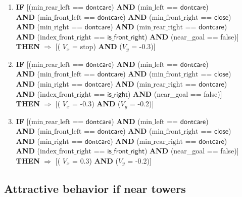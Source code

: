 \begin{enumerate}
	\item \textbf{IF} [($\text{min\_rear\_left}$ == $\textsf{dontcare}$) 
	\textbf{AND} ($\text{min\_left}$ == $\textsf{dontcare}$)\\
	\textbf{AND} ($\text{min\_front\_left}$ == $\textsf{dontcare}$)
	\textbf{AND} ($\text{min\_front\_right}$ == $\textsf{close}$)\\
	\textbf{AND} ($\text{min\_right}$ == $\textsf{dontcare}$) 
	\textbf{AND} ($\text{min\_rear\_right}$ == $\textsf{dontcare}$) \\
	\textbf{AND} ($\text{index\_front\_right}$ == $\textsf{is\_front\_right}$)
	\textbf{AND} (near\_goal == \textsf{false})]\\
	\textbf{THEN} $\Rightarrow$ [( $V_x$ = \textsf{stop}) \textbf{AND} ($V_y$ = \textsf{-0.3})]
	
	\item \textbf{IF} [($\text{min\_rear\_left}$ == $\textsf{dontcare}$) 
	\textbf{AND} ($\text{min\_left}$ == $\textsf{dontcare}$)\\
	\textbf{AND} ($\text{min\_front\_left}$ == $\textsf{dontcare}$)
	\textbf{AND} ($\text{min\_front\_right}$ == $\textsf{close}$)\\
	\textbf{AND} ($\text{min\_right}$ == $\textsf{dontcare}$) 
	\textbf{AND} ($\text{min\_rear\_right}$ == $\textsf{dontcare}$) \\
	\textbf{AND} ($\text{index\_front\_right}$ == $\textsf{is\_right}$)
	\textbf{AND} (near\_goal == \textsf{false})]\\
	\textbf{THEN} $\Rightarrow$ [( $V_x$ = \textsf{-0.3}) \textbf{AND} ($V_y$ = \textsf{-0.2})]
	
	\item \textbf{IF} [($\text{min\_rear\_left}$ == $\textsf{dontcare}$) 
	\textbf{AND} ($\text{min\_left}$ == $\textsf{dontcare}$)\\
	\textbf{AND} ($\text{min\_front\_left}$ == $\textsf{dontcare}$)
	\textbf{AND} ($\text{min\_front\_right}$ == $\textsf{close}$)\\
	\textbf{AND} ($\text{min\_right}$ == $\textsf{dontcare}$) 
	\textbf{AND} ($\text{min\_rear\_right}$ == $\textsf{dontcare}$) \\
	\textbf{AND} ($\text{index\_front\_right}$ == $\textsf{is\_front\_right}$)
	\textbf{AND} (near\_goal == \textsf{false})]\\
	\textbf{THEN} $\Rightarrow$ [( $V_x$ = \textsf{0.3}) \textbf{AND} ($V_y$ = \textsf{-0.2})]
\end{enumerate}

\subsection{Attractive behavior if near towers}

